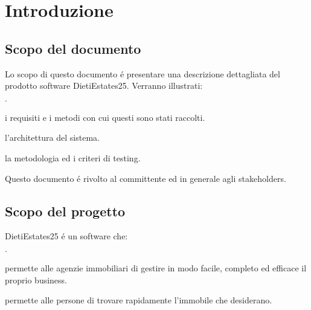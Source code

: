 \chapter{Introduzione}
\section{Scopo del documento}

Lo scopo di questo documento é presentare una descrizione dettagliata del 
prodotto software DietiEstates25. Verranno illustrati: 
\begin{list}{$\cdot$}{}
    \item i requisiti e i metodi con cui questi sono stati raccolti.
    \item l'architettura del sistema.
    \item la metodologia ed i criteri di testing.
\end{list} 

\noindent 
Questo documento é rivolto al committente ed in generale agli stakeholders. 

\section{Scopo del progetto}
DietiEstates25 é un software che:
\begin{list}{$\cdot$}{}
    \item permette alle agenzie immobiliari di gestire in modo facile,
    completo ed efficace il proprio business.
    \item permette alle persone di trovare rapidamente l'immobile 
    che desiderano.
\end{list}

